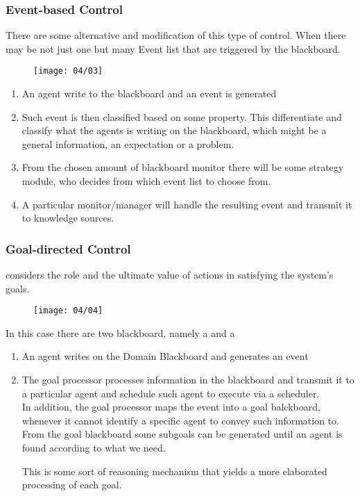 \subsubsection{Event-based Control}
There are some alternative and modification of this type of control. When there may be not just one but many Event list that are triggered by the blackboard.
\begin{figure}[!h]
\centering
\texttt{[image: 04/03]}
\end{figure}
\begin{enumerate}
\item An agent write to the blackboard and an event is generated
\item Such event is then classified based on some property. This differentiate and classify what the agents is writing on the blackboard, which might be a general information, an expectation or a problem.
\item From the chosen amount of blackboard monitor there will be some strategy module, who decides from which event list to choose from.
\item A particular monitor/manager will handle the resulting event and transmit it to knowledge sources.
\end{enumerate}

\subsubsection{Goal-directed Control}
 considers the role and the ultimate value of actions in satisfying the system's goals.

\begin{figure}[!h]
\centering
\texttt{[image: 04/04]}
\end{figure}
In this case there are two blackboard, namely a  and a 

\begin{enumerate}
\item An agent writes on the Domain Blackboard and generates an event
\item The goal processor processes information in the blackboard and transmit it to a particular agent and schedule such agent to execute via a scheduler.\\
In addition, the goal processor maps the event into a goal balckboard, whenever it cannot identify a specific agent to convey such information to.\\
From the goal blackboard some subgoals can be generated until an agent is found according to what we need.

This is some sort of reasoning mechanism that yields a more elaborated processing of each goal.
\end{enumerate}

